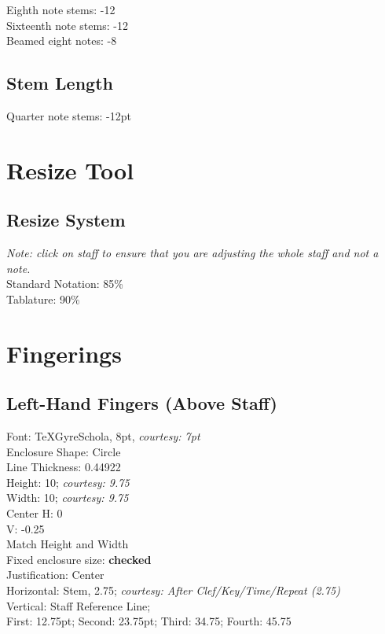 \documentclass[10pt,twoside]{article} %
\begin{document}
Eighth note stems: -12\\
Sixteenth note stems: -12\\
Beamed eight notes: -8

\subsection{Stem Length}
\label{sec:stem-length}

Quarter note stems: -12pt

\section{Resize Tool}
\label{sec:resize-tool}

\subsection{Resize System}
\label{sec:resize-system}

\emph{Note: click on staff to ensure that you are adjusting the whole staff and not a note.}\\

\noindent Standard Notation: 85\%\\
Tablature: 90\%

\section{Fingerings}
\label{sec:fingerings}

\subsection{Left-Hand Fingers (Above Staff)}
\label{sec:left-hand-fingers}

Font: TeXGyreSchola, 8pt, \emph{courtesy: 7pt}\\
Enclosure Shape: Circle\\
Line Thickness: 0.44922\\
Height: 10; \emph{courtesy: 9.75}\\
Width: 10; \emph{courtesy: 9.75}\\
Center H: 0\\
V: -0.25\\
Match Height and Width\\
Fixed enclosure size: \textbf{checked}\\
Justification: Center\\
Horizontal: Stem, 2.75; \emph{courtesy: After Clef/Key/Time/Repeat (2.75)}\\
Vertical: Staff Reference Line;\\
First: 12.75pt; Second: 23.75pt; Third: 34.75; Fourth: 45.75
\end{document}
